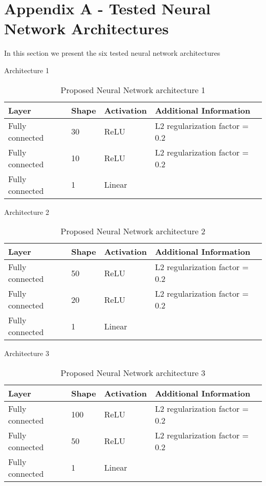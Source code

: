 \section{Appendix A - Tested Neural Network Architectures}
\label{sec:appendices}


In this section we present the six tested neural network architectures

Architecture 1

\begin{table}[!htb]
\centering
\begin{tabular}{l l l l}
	\hline
	Layer & Shape & Activation & Additional Information\\
  	\hline
  	Fully connected & 30 & ReLU & L2 regularization factor = 0.2\\
  	Fully connected & 10 & ReLU & L2 regularization factor = 0.2\\
  	Fully connected & 1 & Linear & \\
  	\hline
\end{tabular}
\caption{Proposed Neural Network architecture 1}
\label{table:proposed_nn_1}
\end{table}

Architecture 2

\begin{table}[!htb]
\centering
\begin{tabular}{l l l l}
	\hline
	Layer & Shape & Activation & Additional Information\\
  	\hline
  	Fully connected & 50 & ReLU & L2 regularization factor = 0.2\\
  	Fully connected & 20 & ReLU & L2 regularization factor = 0.2\\
  	Fully connected & 1 & Linear & \\
  	\hline
\end{tabular}
\caption{Proposed Neural Network architecture 2}
\label{table:proposed_nn_2}
\end{table}

Architecture 3

\begin{table}[!htb]
\centering
\begin{tabular}{l l l l}
	\hline
	Layer & Shape & Activation & Additional Information\\
  	\hline
  	Fully connected & 100 & ReLU & L2 regularization factor = 0.2\\
  	Fully connected & 50 & ReLU & L2 regularization factor = 0.2\\
  	Fully connected & 1 & Linear & \\
  	\hline
\end{tabular}
\caption{Proposed Neural Network architecture 3}
\label{table:proposed_nn_3}
\end{table}

